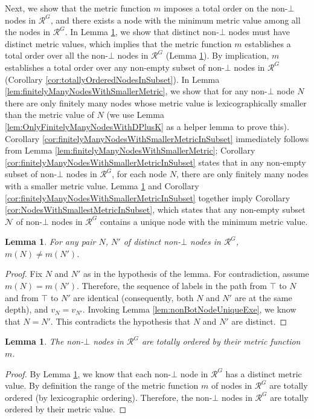 \documentclass[11pt]{article}
\numberwithin{theorem}{section}
\newtheorem{lemma}[theorem]{Lemma}
\begin{document}
Next, we show that the metric function $m$ imposes a total order on the non-$\bot$ nodes in $\mathcal{R}^G$, and there exists a node with the minimum metric value among all the nodes in $\mathcal{R}^G$.
In Lemma \ref{lem:distinctMetricValueDistinctNodes}, we show that distinct non-$\bot$ nodes must have distinct metric values, which implies that the metric function $m$ establishes a total order over all the non-$\bot$ nodes in $\mathcal{R}^G$ (Lemma \ref{lem:totallyOrderedNodesInTree}).
By implication, $m$ establishes a total order over any non-empty subset of non-$\bot$ nodes in $\mathcal{R}^G$ (Corollary \ref{cor:totallyOrderedNodesInSubset}).
In Lemma \ref{lem:finitelyManyNodesWithSmallerMetric}, we show that for any non-$\bot$ node $N$ there are only finitely many nodes whose metric value is lexicographically smaller than the metric value of $N$ (we use Lemma \ref{lem:OnlyFinitelyManyNodesWithDPlusK} as a helper lemma to prove this). 
Corollary \ref{cor:finitelyManyNodesWithSmallerMetricInSubset} immediately follows from Lemma \ref{lem:finitelyManyNodesWithSmallerMetric};  Corollary \ref{cor:finitelyManyNodesWithSmallerMetricInSubset} states that in any non-empty subset of non-$\bot$ nodes in $\mathcal{R}^G$, for each node $N$, there are only finitely many nodes with a smaller metric value. Lemma \ref{lem:totallyOrderedNodesInTree} and Corollary \ref{cor:finitelyManyNodesWithSmallerMetricInSubset} together imply Corollary \ref{cor:NodesWithSmallestMetricInSubset}, which states that any non-empty subset $\mathcal{N}$ of non-$\bot$ nodes in $\mathcal{R}^G$ contains a unique node with the minimum metric value.

\begin{lemma}\label{lem:distinctMetricValueDistinctNodes}
For any pair $N$, $N'$ of distinct non-$\bot$ nodes in $\mathcal{R}^G$, $m(N) \neq m(N')$.
\end{lemma}
 \begin{proof}
Fix $N$ and $N'$ as in the hypothesis of the lemma. For contradiction, assume $m(N) = m(N')$. Therefore, the sequence of labels in the path from $\top$ to $N$ and from $\top$ to $N'$ are identical (consequently, both $N$ and $N'$ are at the same depth), and $v_N = v_{N'}$. Invoking Lemma \ref{lem:nonBotNodeUniqueExe}, we know that $N = N'$. This contradicts the hypothesis that $N$ and $N'$ are distinct.
 \end{proof}



\begin{lemma}\label{lem:totallyOrderedNodesInTree}
The non-$\bot$ nodes in $\mathcal{R}^G$ are totally ordered by their metric function $m$.
\end{lemma}
\begin{proof}
By Lemma \ref{lem:distinctMetricValueDistinctNodes}, we know that each non-$\bot$ node in $\mathcal{R}^G$ has a distinct metric value. By definition the range of the metric function $m$ of nodes in $\mathcal{R}^G$ are totally ordered (by lexicographic ordering).
Therefore, the non-$\bot$ nodes in $\mathcal{R}^G$ are totally ordered by their metric value.
\end{proof}
\end{document}
